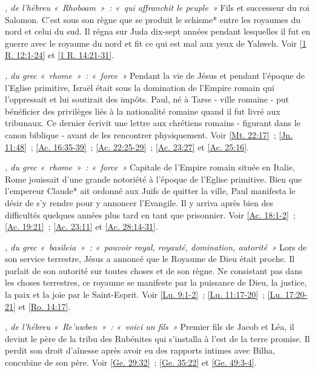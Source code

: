 \begin{multicols}{2}
\textit{, de l'hébreu «~Rhoboam~»~: «~qui affranchit le peuple~»}\newline
Fils et successeur du roi Salomon. C'est sous son règne que se produit le schisme* entre les royaumes du nord et celui du sud. Il régna sur Juda dix-sept années pendant lesquelles il fut en guerre avec le royaume du nord et fit ce qui est mal aux yeux de Yahweh. Voir \vref{1 R. 12:1-24} et \vref{1 R. 14:21-31}.

\textit{, du grec «~rhome~»~: «~force~»}\newline
Pendant la vie de Jésus et pendant l'époque de l'Eglise primitive, Israël était sous la domination de l'Empire romain qui l'oppressait et lui soutirait des impôts. Paul, né à Tarse - ville romaine - put bénéficier des privilèges liés à la nationalité romaine quand il fut livré aux tribunaux. Ce dernier écrivit une lettre aux chrétiens romains - figurant dans le canon biblique - avant de les rencontrer physiquement. Voir \vref{Mt. 22:17}~; \vref{Jn. 11:48}~; \vref{Ac. 16:35-39}~; \vref{Ac. 22:25-29}~; \vref{Ac. 23:27} et \vref{Ac. 25:16}.

\textit{, du grec «~rhome~»~: «~force~»}\newline
Capitale de l'Empire romain située en Italie, Rome jouissait d'une grande notoriété à l'époque de l'Eglise primitive. Bien que l'empereur Claude* ait ordonné aux Juifs de quitter la ville, Paul manifesta le désir de s'y rendre pour y annoncer l'Evangile. Il y arriva après bien des difficultés quelques années plus tard en tant que prisonnier. Voir \vref{Ac. 18:1-2}~; \vref{Ac. 19:21}~; \vref{Ac. 23:11} et \vref{Ac. 28:14-31}.

\textit{, du grec «~basileia~»~: «~pouvoir royal, royauté, domination, autorité~»}\newline
Lors de son service terrestre, Jésus a annoncé que le Royaume de Dieu était proche. Il parlait de son autorité sur toutes choses et de son règne. Ne consistant pas dans les choses terrestres, ce royaume se manifeste par la puissance de Dieu, la justice, la paix et la joie par le Saint-Esprit. Voir \vref{Lu. 9:1-2}~; \vref{Lu. 11:17-20}~; \vref{Lu. 17:20-21} et \vref{Ro. 14:17}.

\textit{, de l'hébreu «~Re'uwben~»~: «~voici un fils~»}\newline
Premier fils de Jacob et Léa, il devint le père de la tribu des Rubénites qui s'installa à l'est de la terre promise. Il perdit son droit d'aînesse après avoir eu des rapports intimes avec Bilha, concubine de son père. Voir \vref{Ge. 29:32}~; \vref{Ge. 35:22} et \vref{Ge. 49:3-4}.


\end{multicols}
